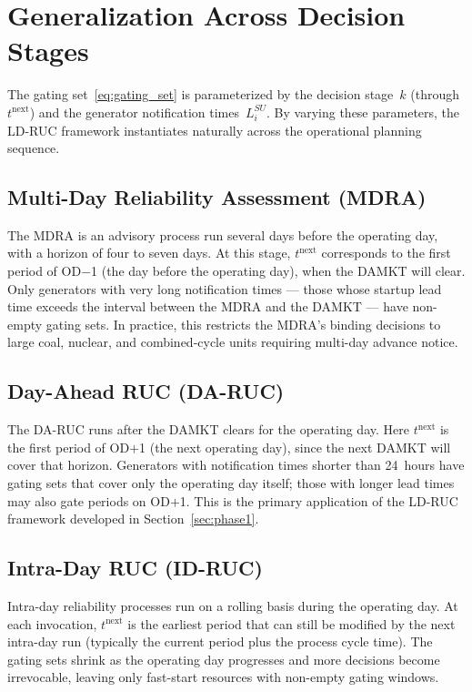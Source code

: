 \documentclass[journal]{IEEEtran}
\begin{document}
\section{Generalization Across Decision Stages}\label{sec:general}

The gating set~\eqref{eq:gating_set} is parameterized by the
decision stage~$k$ (through $t^{\text{next}}$) and the generator
notification times~$L_i^{SU}$.
By varying these parameters, the LD-RUC framework instantiates
naturally across the operational planning sequence.

\subsection{Multi-Day Reliability Assessment (MDRA)}

The MDRA is an advisory process run several days before the operating
day, with a horizon of four to seven days.
At this stage, $t^{\text{next}}$ corresponds to the first period of
OD$-$1 (the day before the operating day), when the DAMKT will
clear.
Only generators with very long notification times --- those whose
startup lead time exceeds the interval between the MDRA and the
DAMKT --- have non-empty gating sets.
In practice, this restricts the MDRA's binding decisions to large
coal, nuclear, and combined-cycle units requiring multi-day advance
notice.

\subsection{Day-Ahead RUC (DA-RUC)}

The DA-RUC runs after the DAMKT clears for the operating day.
Here $t^{\text{next}}$ is the first period of OD$+$1 (the next
operating day), since the next DAMKT will cover that horizon.
Generators with notification times shorter than 24~hours have gating
sets that cover only the operating day itself; those with longer lead
times may also gate periods on OD$+$1.
This is the primary application of the LD-RUC framework developed in
Section~\ref{sec:phase1}.

\subsection{Intra-Day RUC (ID-RUC)}

Intra-day reliability processes run on a rolling basis during the
operating day.
At each invocation, $t^{\text{next}}$ is the earliest period that can
still be modified by the next intra-day run (typically the current
period plus the process cycle time).
The gating sets shrink as the operating day progresses and more
decisions become irrevocable, leaving only fast-start resources with
non-empty gating windows.
\end{document}
